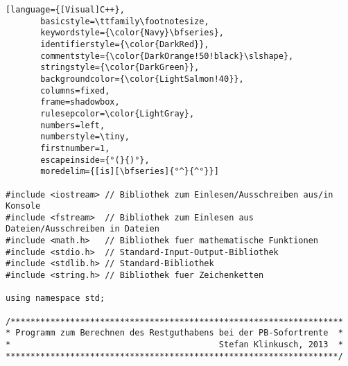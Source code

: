 \documentclass[10pt, a4paper]{article}
\begin{document}
\begin{lstlisting}[language={[Visual]C++},
       basicstyle=\ttfamily\footnotesize,
       keywordstyle={\color{Navy}\bfseries},
       identifierstyle={\color{DarkRed}},
       commentstyle={\color{DarkOrange!50!black}\slshape},
       stringstyle={\color{DarkGreen}},
       backgroundcolor={\color{LightSalmon!40}},
       columns=fixed,
       frame=shadowbox,
       rulesepcolor=\color{LightGray},
       numbers=left,
       numberstyle=\tiny,
       firstnumber=1,
       escapeinside={°(}{)°},
       moredelim={[is][\bfseries]{°^}{^°}}]

#include <iostream> // Bibliothek zum Einlesen/Ausschreiben aus/in Konsole
#include <fstream>  // Bibliothek zum Einlesen aus Dateien/Ausschreiben in Dateien
#include <math.h>   // Bibliothek fuer mathematische Funktionen
#include <stdio.h>  // Standard-Input-Output-Bibliothek
#include <stdlib.h> // Standard-Bibliothek
#include <string.h> // Bibliothek fuer Zeichenketten

using namespace std; 

/*******************************************************************
* Programm zum Berechnen des Restguthabens bei der PB-Sofortrente  *
*                                          Stefan Klinkusch, 2013  *
*******************************************************************/


\end{lstlisting}
\end{document}
